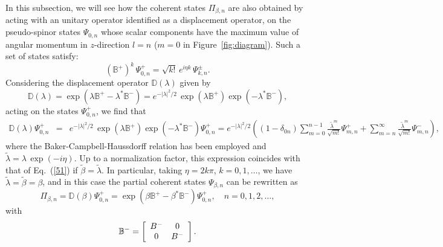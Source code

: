 \documentclass[aps,showpacs,showkeys]{revtex4}
\begin{document}
In this subsection, we will see how the coherent states $\Pi_{\beta,n}$ are also obtained by acting with an unitary operator identified as a displacement operator, on the pseudo-spinor states $\Psi_{0,n}$ whose scalar components have the maximum value of angular momentum in $z$-direction $l=n$ ($m=0$ in Figure~\ref{fig:diagram}). Such a set of states satisfy:
	\begin{equation}
	(\mathbb{B}^+)^k\, \Psi_{0,n}^+=\sqrt{k!}\,e^{i\eta k}\, \Psi_{k,n}^{\pm}. \label{54}
	\end{equation}
Considering the displacement operator $\mathbb{D}(\lambda)$ given by
\begin{equation}\label{55}
\mathbb{D}(\lambda)=\exp\left(\lambda\mathbb{B}^+-\lambda^\ast\mathbb{B}^-\right)=e^{-\vert\lambda\vert^2/2}\, \exp\left(\lambda\mathbb{B}^+\right)\exp\left(-\lambda^\ast\mathbb{B}^-\right),
\end{equation}
acting on the states $\Psi_{0,n}^+$, we find that
\begin{eqnarray}\label{56}
\nonumber \mathbb{D}(\lambda)\Psi_{0,n}^+&=& e^{-\vert\lambda\vert^2/2}\, \exp\left(\lambda\mathbb{B}^+\right)\exp\left(-\lambda^\ast\mathbb{B}^-\right)\Psi_{0,n}^+ =e^{-\vert\lambda\vert^2/2}  \left( (1-\delta_{0n})\sum_{m=0}^{n-1}\frac{\tilde{\lambda}^m}{\sqrt{m!}}\Psi_{m,n}^+ +\sum_{m=n}^{\infty}\frac{\tilde{\lambda}^m}{\sqrt{m!}}\Psi_{m,n}^- \right),
\end{eqnarray}
where the Baker-Campbell-Haussdorff relation has been employed and $\tilde{\lambda}=\lambda\,\exp\left(-i\eta\right)$. Up to a normalization factor, this expression coincides with that of Eq.~(\ref{51}) if $\tilde{\beta}=\tilde{\lambda}$. In particular, taking $\eta=2k\pi$, $k=0,1,\dots$, we have $\tilde{\lambda}=\tilde{\beta}=\beta$, and in this case the partial coherent states $\Psi_{\beta,n}$ can be rewritten as
\begin{equation}\label{57}
\Pi_{\beta,n}=\mathbb{D}(\beta)\Psi_{0,n}^+=\exp\left(\beta\mathbb{B}^+-\beta^\ast\mathbb{B}^-\right)\Psi_{0,n}^+, \quad n=0,1,2,\dots,
\end{equation}
with
\begin{equation}\label{58}
\mathbb{B}^-=\left[\begin{array}{c c}
B^- & 0 \\
0 & B^-
\end{array}\right].
\end{equation}
\end{document}
